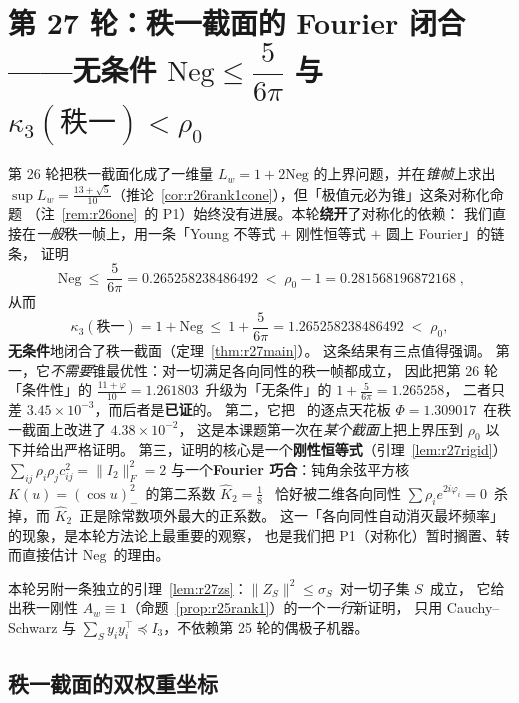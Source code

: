 \section{第 27 轮：秩一截面的 Fourier 闭合——无条件 $\mathrm{Neg}\le\dfrac5{6\pi}$ 与 $\kappa_3(\text{秩一})<\rho_0$}\label{sec:r27}

第 26 轮把秩一截面化成了一维量 $L_w=1+2\mathrm{Neg}$ 的上界问题，并在\emph{锥帧}上求出
$\sup L_w=\frac{13+\sqrt5}{10}$（推论~\ref{cor:r26rank1cone}），但「极值元必为锥」这条对称化命题
（注~\ref{rem:r26one}~的 P1）始终没有进展。本轮\textbf{绕开}了对称化的依赖：
我们直接在\emph{一般}秩一帧上，用一条「Young 不等式 $+$ 刚性恒等式 $+$ 圆上 Fourier」的链条，
证明
\begin{equation}\label{eq:r27head}
\boxed{\;\mathrm{Neg}\ \le\ \frac5{6\pi}=0.265258238486492\;<\;\rho_0-1=0.281568196872168\;},
\end{equation}
从而
\begin{equation}\label{eq:r27kappa}
\kappa_3(\text{秩一})=1+\mathrm{Neg}\ \le\ 1+\frac5{6\pi}=1.265258238486492\;<\;\rho_0 ,
\end{equation}
\textbf{无条件}地闭合了秩一截面（定理~\ref{thm:r27main}）。
这条结果有三点值得强调。
第一，它\emph{不需要}锥最优性：对一切满足各向同性的秩一帧都成立，
因此把第 26 轮「条件性」的 $\frac{11+\varphi}{10}=1.261803$~升级为「无条件」的 $1+\frac5{6\pi}=1.265258$，
二者只差 $3.45\times10^{-3}$，而后者是\textbf{已证}的。
第二，它把 \STW\ 的逐点天花板 $\Phi=1.309017$~在秩一截面上改进了 $4.38\times10^{-2}$，
这是本课题第一次在\emph{某个截面}上把上界压到 $\rho_0$ 以下并给出严格证明。
第三，证明的核心是一个\textbf{刚性恒等式}（引理~\ref{lem:r27rigid}）
$\sum_{ij}\rho_i\rho_jc_{ij}^2=\|I_2\|_F^2=2$
与一个\textbf{Fourier 巧合}：钝角余弦平方核 $K(u)=(\cos u)_-^2$~的第二系数 $\widehat K_2=\frac18$~
恰好被二维各向同性 $\sum\rho_ie^{2i\varphi_i}=0$~杀掉，而 $\widehat K_2$~正是除常数项外最大的正系数。
这一「各向同性自动消灭最坏频率」的现象，是本轮方法论上最重要的观察，
也是我们把 P1（对称化）暂时搁置、转而直接估计 $\mathrm{Neg}$~的理由。

本轮另附一条独立的引理~\ref{lem:r27zs}：$\|Z_S\|^2\le\sigma_S$~对一切子集 $S$~成立，
它给出秩一刚性 $A_w\equiv1$（命题~\ref{prop:r25rank1}）的一个\emph{一行}新证明，
只用 Cauchy--Schwarz 与 $\sum_S y_iy_i^\top\preceq I_3$，不依赖第 25 轮的偶极子机器。

\subsection{秩一截面的双权重坐标}\label{sec:r27:setup}

